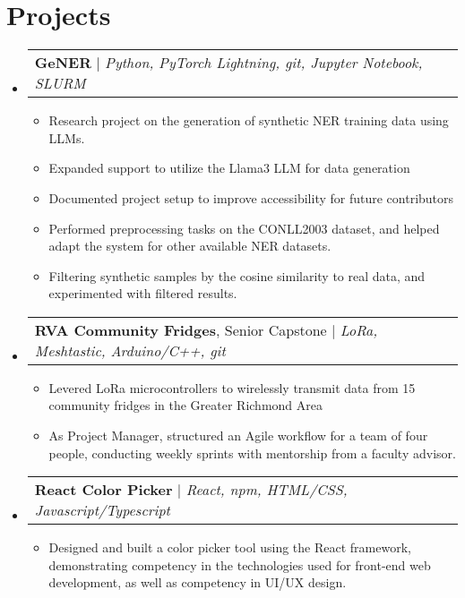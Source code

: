\documentclass[letterpaper,11pt]{article}
\makeatletter
\newcommand{\resumeItem}[1]{
  \item\small{
    {#1 \vspace{-2pt}}
  }
}
\newcommand{\resumeProjectHeading}[2]{
    \item
    \begin{tabular*}{0.97\textwidth}{l@{\extracolsep{\fill}}r}
      \small#1 & #2 \\
    \end{tabular*}\vspace{-7pt}
}
\newcommand{\resumeSubHeadingListStart}{\begin{itemize}[leftmargin=0.15in, label={}]}
\newcommand{\resumeSubHeadingListEnd}{\end{itemize}}
\newcommand{\resumeItemListStart}{\begin{itemize}}
\newcommand{\resumeItemListEnd}{\end{itemize}\vspace{-5pt}}
\makeatother
\begin{document}
\section{Projects}
    \resumeSubHeadingListStart
      \resumeProjectHeading
      {\textbf{GeNER} $|$ \emph{Python, PyTorch Lightning, git, Jupyter Notebook, SLURM}}{}
          \resumeItemListStart
            \resumeItem{Research project on the generation of synthetic NER training data using LLMs.}
            \resumeItem{Expanded support to utilize the Llama3 LLM for data generation}
            \resumeItem{Documented project setup to improve accessibility for future contributors}
            \resumeItem{Performed preprocessing tasks on the CONLL2003 dataset, and helped adapt the system for other available NER datasets.}
            \resumeItem{Filtering synthetic samples by the cosine similarity to real data, and experimented with filtered results.}
          \resumeItemListEnd
      \resumeProjectHeading
      {\textbf{RVA Community Fridges}, Senior Capstone $|$ \emph{LoRa, Meshtastic, Arduino/C++, git}}{}
        \resumeItemListStart
            \resumeItem{Levered LoRa microcontrollers to wirelessly transmit data from 15 community fridges in the Greater Richmond Area}
            \resumeItem{As Project Manager, structured an Agile workflow for a team of four people, conducting weekly sprints with mentorship from a faculty advisor. }
        \resumeItemListEnd
      \resumeProjectHeading
      {\textbf{React Color Picker} $|$ \emph{React, npm, HTML/CSS, Javascript/Typescript}}{}
          \resumeItemListStart
            \resumeItem{Designed and built a color picker tool using the React framework, demonstrating competency in the technologies used for front-end web development, as well as competency in UI/UX design. }
          \resumeItemListEnd
    \resumeSubHeadingListEnd



%


\end{document}
